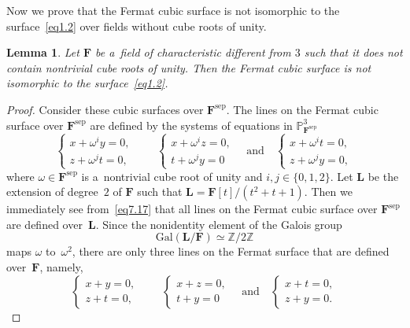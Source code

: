 \documentclass{amsart}
\numberwithin{equation}{section}
\theoremstyle{plain}
\newtheorem{lemma}{Lemma}
\theoremstyle{definition}
\theoremstyle{remark}
\begin{document}
Now we prove that the Fermat cubic surface is not isomorphic to the surface~\eqref{eq1.2} over fields without cube roots of unity.

\begin{lemma}
\label{l55}
Let $\mathbf{F}$ be a~field of characteristic different from $3$ such that it does not contain nontrivial cube roots of unity. Then the Fermat cubic surface is not isomorphic to the surface~\eqref{eq1.2}.
\end{lemma}

\begin{proof}
Consider these cubic surfaces over $\mathbf{F}^{\mathrm{sep}}$. The lines on the Fermat cubic surface over $\mathbf{F}^{\mathrm{sep}}$ are defined by the systems of equations in $\mathbb{P}^3_{\mathbf{F}^{\mathrm{sep}}}$
\begin{equation}
\label{eq7.17}
\begin{cases}
x+\omega^i y=0,\\
z+\omega^jt=0,
\end{cases}
\qquad
\begin{cases}
x+\omega^i z=0,\\
t+\omega^jy=0
\end{cases}
\quad\text{and}\quad
\begin{cases}
x+\omega^i t=0,\\
z+\omega^jy=0,
\end{cases}
\end{equation}
where $\omega \in \mathbf{F}^{\mathrm{sep}}$ is a~nontrivial cube root of unity and $i,j \in \{0,1,2\}$. Let $\mathbf{L}$ be the extension of degree~$2$ of $\mathbf{F}$ such that $\mathbf{L}=\mathbf{F}[t]/(t^2+t+1)$. Then we immediately see from~\eqref{eq7.17} that all lines on the Fermat cubic surface over $\mathbf{F}^{\mathrm{sep}}$ are defined over~$\mathbf{L}$. Since the nonidentity element of the Galois group
$$
\mathrm{Gal}(\mathbf{L}/\mathbf{F}) \simeq \mathbb{Z}/2\mathbb{Z}
$$
maps $\omega$ to~$\omega^2$, there are only three lines on the Fermat surface that are defined over~$\mathbf{F}$, namely,
$$
\begin{cases}
x+ y=0,\\
z+t=0,
\end{cases}
\qquad
\begin{cases}
x+ z=0,\\
t+y=0
\end{cases}
\quad\text{and}\quad
\begin{cases}
x+ t=0,\\
z+y=0.
\end{cases}
$$


\end{proof}
\end{document}
